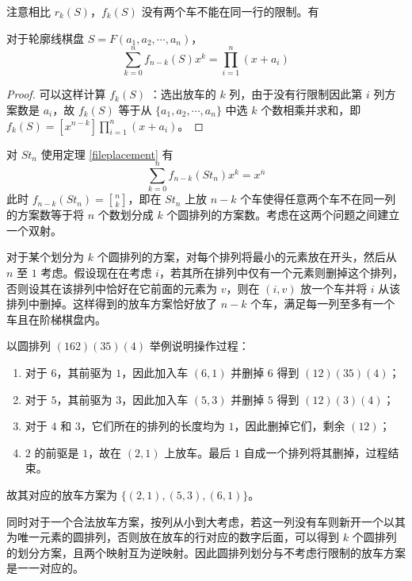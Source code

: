 \documentclass{noithesis}
\begin{document}
	注意相比 $r_k(S)$，$f_k(S)$ 没有两个车不能在同一行的限制。有 
	\begin{theorem}\label{fileplacement}
		对于轮廓线棋盘 $S = F(a_1,a_2,\cdots,a_n)$，
		\begin{equation}
			\sum_{k=0}^n f_{n-k}(S)x^k = \prod_{i=1}^n (x+a_i)
		\end{equation}
	\end{theorem}
	\begin{proof}
		可以这样计算 $f_k(S)$ ：选出放车的 $k$ 列，由于没有行限制因此第 $i$ 列方案数是 $a_i$，故 $f_k(S)$ 等于从 $\{a_1,a_2,\cdots,a_n\}$ 中选 $k$ 个数相乘并求和，即 $f_k(S) = [x^{n-k}] \prod_{i=1}^n (x+a_i)$。
	\end{proof}
	
	对 $St_n$ 使用定理 \ref{fileplacement} 有 \begin{equation}
	\sum_{k=0}^n f_{n-k}(St_n)x^k = x^{\overline n}
	\end{equation}
	此时 $f_{n-k}(St_n) = {n \brack k}$，即在 $St_n$ 上放 $n-k$ 个车使得任意两个车不在同一列的方案数等于将 $n$ 个数划分成 $k$ 个圆排列的方案数。考虑在这两个问题之间建立一个双射。
	
	对于某个划分为 $k$ 个圆排列的方案，对每个排列将最小的元素放在开头，然后从 $n$ 至 $1$ 考虑。假设现在在考虑 $i$，若其所在排列中仅有一个元素则删掉这个排列，否则设其在该排列中恰好在它前面的元素为 $v$，则在 $(i,v)$ 放一个车并将 $i$ 从该排列中删掉。这样得到的放车方案恰好放了 $n-k$ 个车，满足每一列至多有一个车且在阶梯棋盘内。
	
	以圆排列 $(162)(35)(4)$ 举例说明操作过程：
	\begin{enumerate}
		\item 对于 $6$，其前驱为 $1$，因此加入车 $(6,1)$ 并删掉 $6$ 得到 $(12)(35)(4)$；
		\item 对于 $5$，其前驱为 $3$，因此加入车 $(5,3)$ 并删掉 $5$ 得到 $(12)(3)(4)$；
		\item 对于 $4$ 和 $3$，它们所在的排列的长度均为 $1$，因此删掉它们，剩余 $(12)$；
		\item $2$ 的前驱是 $1$，故在 $(2,1)$ 上放车。最后 $1$ 自成一个排列将其删掉，过程结束。
	\end{enumerate}
	
	故其对应的放车方案为 $\{(2,1),(5,3),(6,1)\}$。
	
	同时对于一个合法放车方案，按列从小到大考虑，若这一列没有车则新开一个以其为唯一元素的圆排列，否则放在放车的行对应的数字后面，可以得到 $k$ 个圆排列的划分方案，且两个映射互为逆映射。因此圆排列划分与不考虑行限制的放车方案是一一对应的。
	
\end{document}
